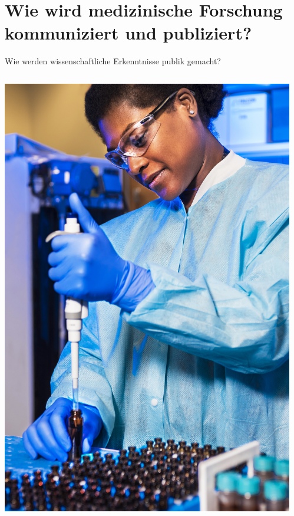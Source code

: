 \documentclass{beamer}
\begin{document}
\section{Wie wird medizinische Forschung kommuniziert und publiziert?}

\begin{frame}{Wie werden wissenschaftliche Erkenntnisse publik gemacht?}

\begin{columns}[c]
    \begin{column}{5cm}
\includegraphics[width=\textwidth]{cdc-_N7I1JyPYJw-unsplash.jpg}        
    \end{column}
\pause
        \begin{column}{7cm}
        \begin{itemize}

\end{itemize}
\end{column}
\end{columns}
\end{frame}
\end{document}

